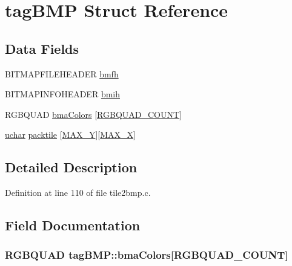 \hypertarget{structtagBMP}{\section{tag\+B\+M\+P Struct Reference}
\label{structtagBMP}
}
\subsection*{Data Fields}
\begin{DoxyCompactItemize}
\item 
B\+I\+T\+M\+A\+P\+F\+I\+L\+E\+H\+E\+A\+D\+E\+R \hyperlink{structtagBMP_a9ce1c9030e45eecb49eda04a971894b5}{bmfh}
\item 
B\+I\+T\+M\+A\+P\+I\+N\+F\+O\+H\+E\+A\+D\+E\+R \hyperlink{structtagBMP_ae18d33e2f0d66ddeed35c319535909f6}{bmih}
\item 
R\+G\+B\+Q\+U\+A\+D \hyperlink{structtagBMP_ac1989f32bf0cb7fd2c4f39a556536bc0}{bma\+Colors} \mbox{[}\hyperlink{tile2bmp_8c_a4fb5da29e780318a15dc7858405de906}{R\+G\+B\+Q\+U\+A\+D\+\_\+\+C\+O\+U\+N\+T}\mbox{]}
\item 
\hyperlink{config_8h_a65f85814a8290f9797005d3b28e7e5fc}{uchar} \hyperlink{structtagBMP_a916a722d033afc6cecb658ebe53b7da6}{packtile} \mbox{[}\hyperlink{tile2bmp_8c_a985cc18be96dda7f59fd0400725e4aef}{M\+A\+X\+\_\+\+Y}\mbox{]}\mbox{[}\hyperlink{tile2bmp_8c_a898606140dee9ce0adf096de00824d94}{M\+A\+X\+\_\+\+X}\mbox{]}
\end{DoxyCompactItemize}


\subsection{Detailed Description}


Definition at line 110 of file tile2bmp.\+c.



\subsection{Field Documentation}
\hypertarget{structtagBMP_ac1989f32bf0cb7fd2c4f39a556536bc0}{
\subsubsection[{bma\+Colors}]{\setlength{\rightskip}{0pt plus 5cm}R\+G\+B\+Q\+U\+A\+D tag\+B\+M\+P\+::bma\+Colors\mbox{[}{\bf R\+G\+B\+Q\+U\+A\+D\+\_\+\+C\+O\+U\+N\+T}\mbox{]}}}\label{structtagBMP_ac1989f32bf0cb7fd2c4f39a556536bc0}


